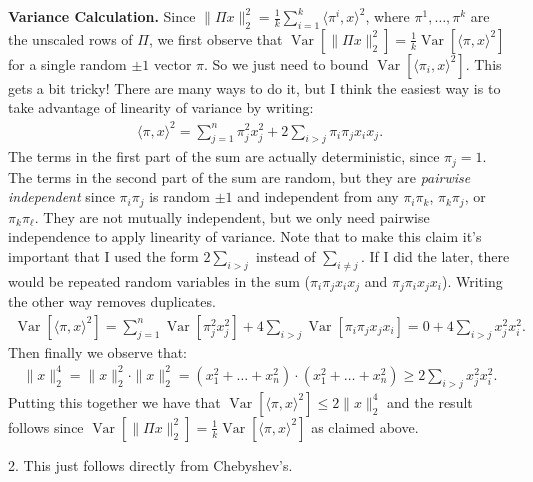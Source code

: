 \documentclass[11pt]{article}
\DeclareMathOperator{\Var}{Var}
\begin{document}
 \textbf{Variance Calculation.} Since $\|\Pi x\|_2^2 = \frac{1}{k}\sum_{i=1}^k \langle \pi^i, x\rangle^2$, where $\pi^1, \ldots, \pi^k$ are the unscaled rows of $\Pi$, we first observe that $\Var[\|\Pi x\|_2^2 ] = \frac{1}{k}\Var[\langle \pi, x\rangle^2]$ for a single random $\pm 1$ vector $\pi$. So we just need to bound $\Var[\langle \pi_i, x\rangle^2]$. This gets a bit tricky! There are many ways to do it, but I think the easiest way is to take advantage of linearity of variance by writing:
 \begin{align*}
 	\langle \pi, x\rangle^2 = \sum_{j=1}^n \pi_j^2 x_j^2 + 2\sum_{i> j} \pi_i\pi_j x_ix_j. 
 \end{align*}
The terms in the first part of the sum are actually deterministic, since $\pi_j = 1$. The terms in the second part of the sum are random, but they are \emph{pairwise independent} since $\pi_i\pi_j$ is random $\pm 1$ and independent from any $\pi_i\pi_k$, $\pi_k\pi_j$, or $\pi_k\pi_{\ell}$. They are not mutually independent, but we only need pairwise independence to apply linearity of variance. 
Note that to make this claim it's important that I used the form $2\sum_{i> j}$ instead of $\sum_{i\neq j}$. If I did the later, there would be repeated random variables in the sum ($\pi_i\pi_j x_ix_j$  and $\pi_j\pi_i x_jx_i$). Writing the other way removes duplicates.
\begin{align*}
	\Var[\langle \pi, x\rangle^2] = \sum_{j=1}^n \Var[\pi_j^2 x_j^2] + 4\sum_{i> j} \Var[\pi_i\pi_j x_jx_i] = 0 + 4\sum_{i> j} x_j^2x_i^2.
\end{align*}
Then finally we observe that:
\begin{align*}
	\|x\|_2^4 = \|x\|_2^2\cdot \|x\|_2^2 = (x_1^2 + \ldots + x_n^2)\cdot (x_1^2 + \ldots + x_n^2) \geq 2\sum_{i> j} x_j^2x_i^2.
\end{align*} 
Putting this together we have that $\Var[\langle \pi, x\rangle^2]  \leq 2 	\|x\|_2^4$ and the result follows since $\Var[\|\Pi x\|_2^2 ] = \frac{1}{k}\Var[\langle \pi, x\rangle^2]$ as claimed above.

\vspace{.5em}
2. This just follows directly from Chebyshev's.
\end{document}
